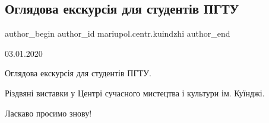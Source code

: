  
 
 
 
 

\subsection{Оглядова екскурсія для студентів ПГТУ}
\label{sec:03_01_2020.fb.mariupol.centr.kuindzhi.1.ogljadova_ekskursia_dlja_studentiv_pgtu}

\ifcmt
 author_begin
   author_id mariupol.centr.kuindzhi
 author_end
\fi

03.01.2020

Оглядова екскурсія для студентів ПГТУ.

Різдвяні виставки у Центрі сучасного мистецтва і культури ім. Куїнджі.

Ласкаво просимо знову!
